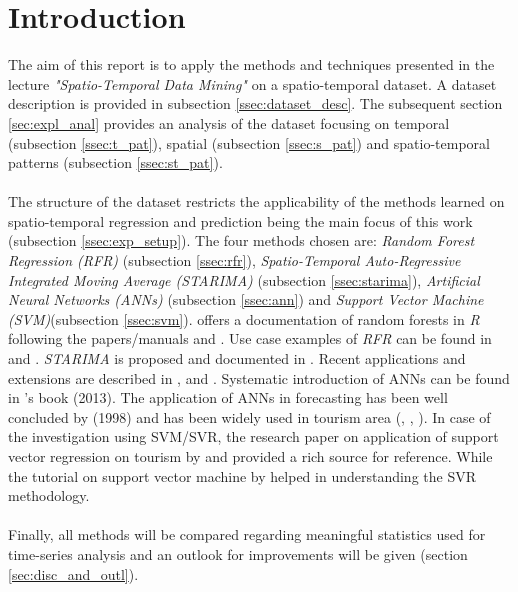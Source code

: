 \documentclass[a4paper,reqno,]{article}
\begin{document}
\section{Introduction}
\label{sec:intro}
The aim of this report is to apply the methods and techniques presented in the lecture \textit{"Spatio-Temporal Data Mining"} on a spatio-temporal dataset. A dataset description is provided in subsection \ref{ssec:dataset_desc}. The subsequent section \ref{sec:expl_anal} provides an analysis of the dataset focusing on temporal (subsection \ref{ssec:t_pat}), spatial (subsection \ref{ssec:s_pat}) and spatio-temporal patterns (subsection \ref{ssec:st_pat}).   
\\
\\
The structure of the dataset restricts the applicability of the methods learned on spatio-temporal regression and prediction being the main focus of this work (subsection \ref{ssec:exp_setup}). The four methods chosen are: \textit{Random Forest Regression (RFR)} (subsection \ref{ssec:rfr}), \textit{Spatio-Temporal Auto-Regressive Integrated Moving Average (STARIMA)} (subsection \ref{ssec:starima}), \textit{Artificial Neural Networks (ANNs)} (subsection \ref{ssec:ann}) and  \textit{Support Vector Machine (SVM)}(subsection \ref{ssec:svm}). \cite{rf_manual} offers a documentation of random forests in \textit{R} following the papers/manuals \cite{breiman2001random} and \cite{rf_usage_manual}. Use case examples of \textit{RFR} can be found in \cite{liaw2002classification} and \cite{segal2004machine}. \textit{STARIMA} is proposed and documented in \cite{pfeifer1981seasonal}. Recent applications and extensions are described in \cite{Islam-KhanRezwan2012PTTi}, \cite{ChengTao2014ADSW} and \cite{PeiboDuan2016Stpw}. Systematic introduction of ANNs can be found in \citeauthor{rojas2013neural}'s book (2013). The application of ANNs in forecasting has been well concluded by \citeauthor{zhang1998forecasting} (1998) and has been widely used in tourism area (\cite{law1999neural}, \cite{burger2001practitioners}, \cite{claveria2014forecasting}). In case of the investigation using SVM/SVR, the research paper on application of support vector regression on tourism by \cite{e} and \cite{f} provided a rich source for reference. While the tutorial on support vector machine by \cite{c} helped in understanding the SVR methodology.  
\\
\\
Finally, all methods will be compared regarding meaningful statistics used for time-series analysis and an outlook for improvements will be given (section \ref{sec:disc_and_outl}). 
\end{document}
